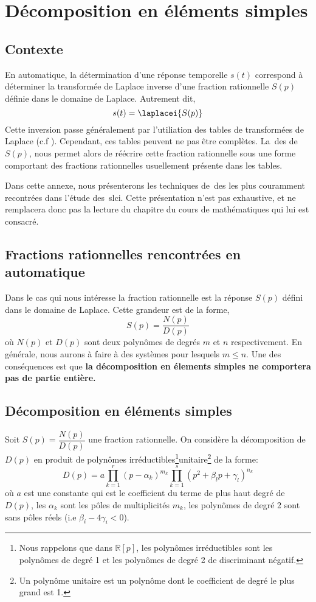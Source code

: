 \chapter{Décomposition en éléments simples\label{annexe-DES}}

\section{Contexte}
En automatique, la détermination d'une réponse temporelle $s(t)$
correspond à déterminer la transformée 
de Laplace inverse d'une fraction rationnelle $S(p)$ 
définie dans le domaine de Laplace. Autrement dit, 
$$
s(t)=\laplacei{S(p)}
$$
Cette inversion passe généralement par l'utiliation des tables de transformées de Laplace 
(c.f ).
Cependant, ces tables peuvent ne pas être complètes. La~\gls{des} de $S(p)$, nous permet alors de 
réécrire cette fraction rationnelle sous une forme comportant 
des fractions rationnelles usuellement présente dans les tables.

Dans cette annexe, nous présenterons les techniques de~\gls{des} les plus couramment
recontrées dans l'étude des~\gls{slci}. 
Cette présentation n'est pas exhaustive, et ne remplacera donc 
pas la lecture du chapitre du cours de mathématiques qui lui est consacré.

\section{Fractions rationnelles rencontrées en automatique}
Dans le cas qui nous intéresse la fraction rationnelle est la réponse $S(p)$ 
défini dans le domaine de Laplace.
Cette grandeur est de la forme,
$$
S(p)=\dfrac{N(p)}{D(p)}
$$
où $N(p)$ et $D(p)$ sont deux polynômes de degrés $m$ et $n$ respectivement.
En générale, nous aurons à faire à des systèmes pour lesquels $m\le n$. 
Une des conséquences est que \textbf{la décomposition en élements simples ne comportera
pas de partie entière.}

\section{Décomposition en éléments simples}

Soit $S(p)=\dfrac{N(p)}{D(p)}$ une fraction rationnelle. On considère la décomposition 
de $D(p)$ en produit de polynômes irréductibles\footnote{Nous rappelons que 
dans $\mathbb{R}[p]$, les polynômes irréductibles sont 
les polynômes de degré 1 et les polynômes de degré 2 de discriminant négatif.}unitaire\footnote{Un polynôme 
unitaire est un polynôme dont le coefficient de degré le plus grand est 1.}
de la forme:
$$
D(p)=a\prod_{k=1}^r(p-\alpha_k)^{m_k}\prod_{k=1}^s(p^2+\beta_lp+\gamma_l)^{n_k}
$$
où $a$ est une constante qui est le coefficient du terme de plus haut degré de $D(p)$, les $\alpha_k$
sont les pôles de multiplicités $m_k$,  les polynômes de degré 2 sont sans pôles réels (i.e $\beta_i-4\gamma_i<0$).

